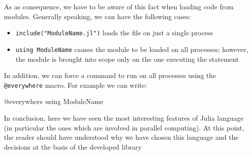 As as consequence, we have to be aware of this fact when loading code from modules. Generally speaking, we can have the following cases:
\begin{itemize}
 \item \texttt{include("ModuleName.jl")} loads the file on just a single process
 \item \texttt{using ModuleName} causes the module to be loaded on all processes; however, the module is brought into scope only on the one executing the statement
\end{itemize}
In addition, we can force a command to run on all processes using the \texttt{@everywhere} macro. For example we can write:
\begin{julia}
 @everywhere using ModuleName
\end{julia}

In conclusion, here we have seen the most interesting features of Julia language (in particular the ones which are involved in parallel computing). At this point, the reader should have understood why we have chosen this language and the decisions at the basis of the developed library